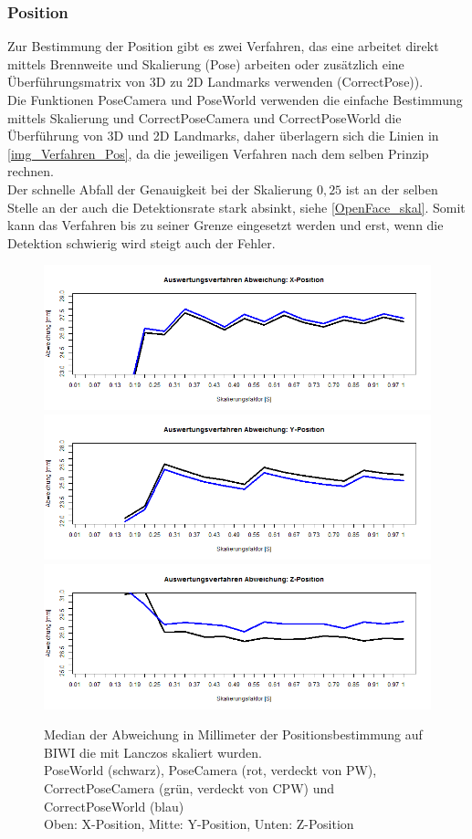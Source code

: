 \subsubsection{Position}
Zur Bestimmung der Position gibt es zwei Verfahren, das eine arbeitet direkt mittels Brennweite und Skalierung (Pose) arbeiten oder zusätzlich eine Überführungsmatrix von 3D zu 2D Landmarks verwenden (CorrectPose)).\\
Die Funktionen PoseCamera und PoseWorld verwenden die einfache Bestimmung mittels Skalierung und CorrectPoseCamera und CorrectPoseWorld die Überführung von 3D und 2D Landmarks, daher überlagern sich die Linien in \autoref{img_Verfahren_Pos}, da die jeweiligen Verfahren nach dem selben Prinzip rechnen.\\
Der schnelle Abfall der Genauigkeit bei der Skalierung $0,25$ ist an der selben Stelle an der auch die Detektionsrate stark absinkt, siehe \autoref{OpenFace_skal}. Somit kann das Verfahren bis zu seiner Grenze eingesetzt werden und erst, wenn die Detektion schwierig wird steigt auch der Fehler.
\begin{figure}
	\centering
	\includegraphics[width=\linewidth]{img_Skalierung/Verfahren_TX}
	\includegraphics[width=\linewidth]{img_Skalierung/Verfahren_TY}
	\includegraphics[width=\linewidth]{img_Skalierung/Verfahren_TZ}
	\caption{Median der Abweichung in Millimeter der Positionsbestimmung auf BIWI \cite{database_Face_Ori} die mit Lanczos skaliert wurden.\\
	PoseWorld (schwarz), PoseCamera (rot, verdeckt von PW), CorrectPoseCamera (grün, verdeckt von CPW) und CorrectPoseWorld (blau)\\
	Oben: X-Position, Mitte: Y-Position, Unten: Z-Position}
	\label{img_Verfahren_Pos}
\end{figure}
